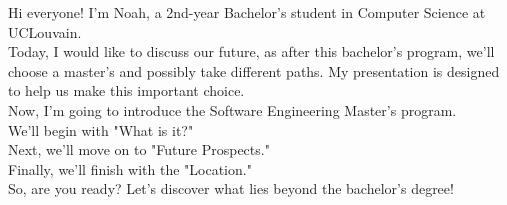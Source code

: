 \documentclass{article}
\begin{document}
Hi everyone! I'm Noah, a 2nd-year Bachelor’s student in Computer Science at UCLouvain.\\

Today, I would like to discuss our future, as after this bachelor’s program, we’ll choose a master’s and possibly take different paths. My presentation is designed to help us make this important choice.\\

Now, I’m going to introduce the Software Engineering Master’s program.\\
We’ll begin with "What is it?"\\
Next, we’ll move on to "Future Prospects." \\
Finally, we’ll finish with the "Location."\\

So, are you ready? Let’s discover what lies beyond the bachelor’s degree!
\end{document}

